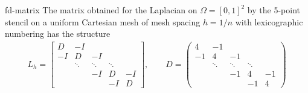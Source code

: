 \begin{Lemma}{fd-matrix}
  The matrix obtained for the Laplacian on $\Omega = [0,1]^2$ by the
  5-point stencil on a uniform Cartesian mesh of mesh spacing $h=1/n$
  with lexicographic numbering has the structure
  \begin{gather*}
    L_h =
    \begin{bmatrix}
      D & -I \\
      -I & D & -I \\
      & \ddots & \ddots & \ddots \\
      & & -I & D & -I \\
      &&& -I & D
    \end{bmatrix}
    ,\qquad
    D =
    \begin{pmatrix}
      4 & -1 \\
      -1 & 4 & -1 \\
      & \ddots & \ddots & \ddots \\
      & & -1 & 4 & -1 \\
      &&& -1 & 4
    \end{pmatrix}
  \end{gather*}
\end{Lemma}

